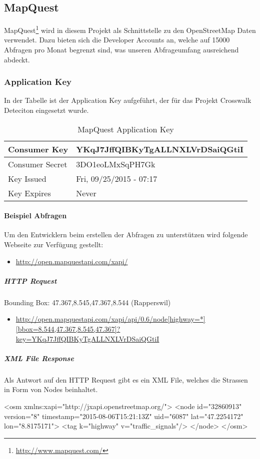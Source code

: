 \subsection{MapQuest}
\Gls{MapQuest}\footnote{\url{http://www.mapquest.com/}} wird in diesem Projekt als Schnittstelle zu den OpenStreetMap Daten verwendet. Dazu bieten sich die Developer Accounts an, welche auf 15000 Abfragen pro Monat begrenzt sind, was unseren Abfrageumfang ausreichend abdeckt.

\subsubsection{Application Key}
In der Tabelle ist der Application Key aufgeführt, der für das Projekt Crosswalk Deteciton eingesetzt wurde.
\begin{table}[H]
    \begin{tabular}{ | p{6cm} | p{6cm}  | }
    \hline    
	Consumer Key &  YKqJ7JffQIBKyTgALLNXLVrDSaiQGtiI \\ \hline
	Consumer Secret & 3DO1eoLMxSqPH7Gk \\ \hline
	Key Issued & Fri, 09/25/2015 - 07:17 \\ \hline
	Key Expires & Never \\ \hline
    \end{tabular}
    \caption[MapQuest Application Key]{MapQuest Application Key}
\end{table}

\paragraph{Beispiel Abfragen}
Um den Entwicklern beim erstellen der Abfragen zu unterstützen wird folgende Webseite zur Verfügung gestellt:
\begin{itemize}
	\item \url{http://open.mapquestapi.com/xapi/}
\end{itemize}

\subparagraph{HTTP Request}
Bounding Box:  47.367,8.545,47.367,8.544 (Rapperswil)
\begin{itemize}
	\item \url{http://open.mapquestapi.com/xapi/api/0.6/node[highway=*][bbox=8.544,47.367,8.545,47.367]?key=YKqJ7JffQIBKyTgALLNXLVrDSaiQGtiI}
\end{itemize}


\subparagraph{XML File Response}
Als Antwort auf den HTTP Request gibt es ein XML File, welches die Strassen in Form von Nodes beinhaltet.\\

\begin{python}
<osm xmlns:xapi="http://jxapi.openstreetmap.org/">
	<node id="32860913" version="8"
		timestamp="2015-08-06T15:21:13Z" uid="6087"
		lat="47.2254172" lon="8.8175171">
		<tag k="highway" v="traffic_signals"/>
	</node>
</osm>
\end{python}

\newpage







